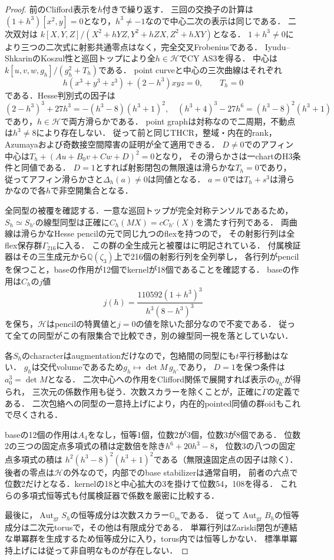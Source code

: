 \begin{proof}
前のClifford表示を$h$付きで繰り返す．
三回の交換子の計算は$(1+h^3)[x^2,y]=0$となり，$h^3\ne-1$なので中心二次の表示は同じである．
二次双対は
$k[X,Y,Z]/(X^2+hYZ,Y^2+hZX,Z^2+hXY)$となる．
$1+h^3\ne0$により三つの二次式に射影共通零点はなく，完全交叉Frobeniusである．
Iyudu--ShkarinのKoszul性と巡回トップにより全$h\in\mathcal H$でCY AS3を得る．
中心は$k[u,v,w,g_h]/(g_h^2+T_h)$である．
point curveと中心の三次曲線はそれぞれ
\[
 h(x^3+y^3+z^3)+(2-h^3)xyz=0,\qquad T_h=0
\]
である．Hesse判別式の因子は
\[
 (2-h^3)^3+27h^3=-(h^3-8)(h^3+1)^2,\quad
 (h^3+4)^3-27h^6=(h^3-8)^2(h^3+1)
\]
であり，$h\in\mathcal H$で両方滑らかである．
point graphは対称なので二周期，不動点は$h^3\ne8$により存在しない．
従って前と同じTHCR，整域・内在的rank，Azumayaおよび奇数接空間障害の証明が全て適用できる．
$D\ne0$でのアフィン中心は$T_h+(Au+B_0v+Cw+D)^2=0$となり，
その滑らかさは一chartのH3条件と同値である．
$D=1$とすれば射影閉包の無限遠は滑らかな$T_h=0$であり，
従ってアフィン滑らかさと$\Delta_h(a)\ne0$は同値となる．
$a=0$では$T_h+s^3$は滑らかなので各$h$で非空開集合となる．

全同型の被覆を確認する．一意な巡回トップが完全対称テンソルであるため，
$S_h\simeq S_{h'}$の線型同型は正確に$C_h(MX)=cC_{h'}(X)$を満たす行列である．
両曲線は滑らかなHesse pencilの元で同じ九つのflexを持つので，
その射影行列は全flex保存群$\Gamma_{216}$に入る．
この群の全生成元と被覆は\cite[Lemma 5.1 and proof]{ISClifford}に明記されている．
付属検証器はその三生成元から$\mathbb Q(\zeta_3)$上で216個の射影行列を全列挙し，
各行列がpencilを保つこと，baseの作用が12個でkernelが18個であることを確認する．
baseの作用は$C_h$の$j$値
\[
 j(h)=\frac{110592(1+h^3)^3}{h^3(8-h^3)^3}
\]
を保ち，$\mathcal H$はpencilの特異値と$j=0$の値を除いた部分なので不変である．
従って全ての同型がこの有限集合で比較でき，別の線型同一視を落としていない．

各$S_h$のcharacterはaugmentationだけなので，包絡間の同型にも$t$平行移動はない．
$g_h$は交代volumeであるため$g_h\mapsto\det M\,g_{h'}$であり，
$D=1$を保つ条件は$a_0^3=\det M$となる．
二次中心への作用をClifford関係で展開すれば表示の$q_{h'}$が得られ，
三次元の係数作用も従う．次数スカラーを除くことが，正確に$\widetilde\Gamma$の定義である．
二次包絡への同型の一意持上げにより，内在的pointed同値の群oidもこれで尽くされる．

baseの12個の作用は$A_4$をなし，恒等1個，位数2が3個，位数3が8個である．
位数2の三つの固定点多項式の積は定数倍を除き$h^6+20h^3-8$，
位数3の八つの固定点多項式の積は
$h^2(h^3-8)^2(h^3+1)^2$である（無限遠固定点の因子は除く）．
後者の零点は$\mathcal H$の外なので，内部でのbase stabilizerは通常自明，
前者の六点で位数2だけとなる．kernelの18と中心拡大の3を掛けて位数54，108を得る．
これらの多項式恒等式も付属検証器で係数を厳密に比較する．

最後に，$\operatorname{Aut}_{\mathrm{gr}}S_h$の恒等成分は次数スカラー$\mathbb G_m$である．
従って$\operatorname{Aut}_{\mathrm{gr}}B_h$の恒等成分は二次元torusで，その他は有限成分である．
単冪行列はZariski閉包が連結な単冪群を生成するため恒等成分に入り，torus内では恒等しかない．
標準単冪持上げには従って非自明なものが存在しない．
\end{proof}

